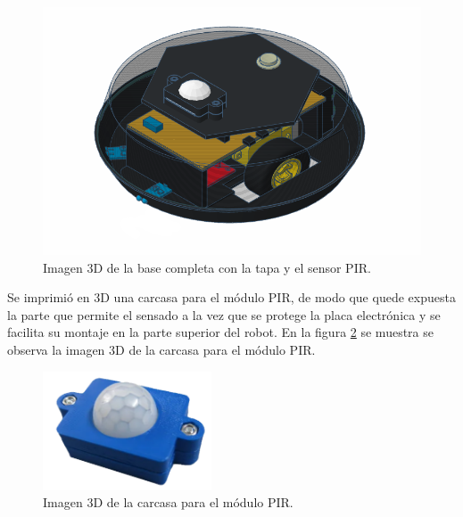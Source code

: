\begin{figure}[h]
	\centering
	\includegraphics[width=13cm]{./Figures/rUVot13xsintapa.PNG}
	\caption{Imagen 3D de la base completa con la tapa y el sensor PIR.}
	\label{fig:rUVot13xsintapa}
\end{figure}

Se imprimió en 3D una carcasa para el módulo PIR, de modo que quede expuesta la parte que permite el sensado a la vez que se protege la placa electrónica y se facilita su montaje en la parte superior del robot. En la figura \ref{fig:pircase} se muestra se observa la imagen 3D de la carcasa para el módulo PIR.


\begin{figure}[h]
	\centering
	\includegraphics[width=5cm]{./Figures/pircase.PNG}
	\caption{Imagen 3D de la carcasa para el módulo PIR.}
	\label{fig:pircase}
\end{figure}

\pagebreak








